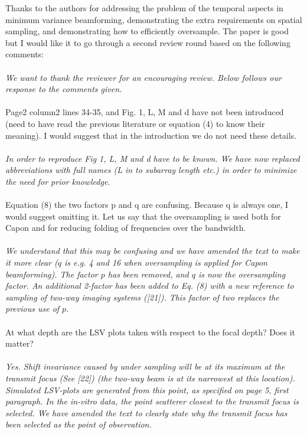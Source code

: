 \documentclass{article}
\begin{document}
Thanks to the authors for addressing the problem of the temporal aspects in minimum variance beamforming, demonstrating the extra requirements on spatial sampling, and demonstrating how to efficiently oversample. The paper is good but I would like it to go through a second review round based on the following comments:
\\\\
\textit{We want to thank the reviewer for an encouraging review. Below follows our response to the comments given.}
\\\\
Page2 column2 lines 34-35, and Fig. 1, L, M and d have not been introduced (need to have read the previous literature or equation (4) to know their meaning). I would suggest that in the introduction we do not need these details.
\\\\
\textit{In order to reproduce Fig 1, L, M and d have to be known. We have now replaced abbreviations with full names (L in to subarray length etc.) in order to minimize the need for prior knowledge.}
\\\\
Equation (8) the two factors p and q are confusing. Because q is always one, I would suggest omitting it.  Let us say that the oversampling is used both for Capon and for reducing folding of frequencies over the bandwidth.
\\\\
\textit{We understand that this may be confusing and we have amended the text to make it more clear ($q$ is e.g. 4 and 16 when oversampling is applied for Capon beamforming). The factor $p$ has been removed, and $q$ is now the oversampling factor. An additional 2-factor has been added to Eq. (8) with a new reference to sampling of two-way imaging systems ([21]). This factor of two replaces the previous use of $p$.}
\\\\
At what depth are the LSV plots taken with respect to the focal depth? Does it matter?
\\\\
\textit{Yes. Shift invariance caused by under sampling will be at its maximum at the transmit focus (See [22]) (the two-way beam is at its narrowest at this location). Simulated LSV-plots are generated from this point, as specified on page 5, first paragraph. In the in-vitro data, the point scatterer closest to the transmit focus is selected. We have amended the text to clearly state why the transmit focus has been selected as the point of observation.}
\end{document}
